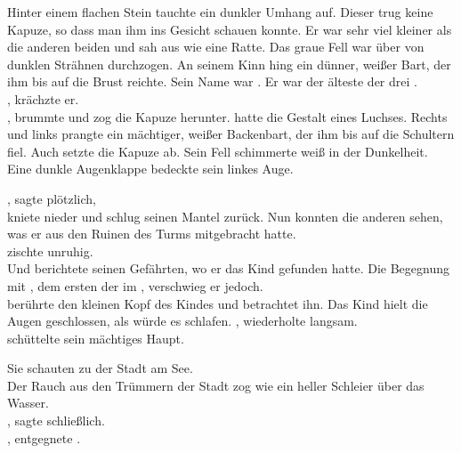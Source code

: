 \begin{Large}
Hinter einem flachen Stein tauchte ein dunkler Umhang auf. Dieser {\Schattenlaufer} trug keine Kapuze, so dass man ihm ins Gesicht schauen konnte. Er war sehr viel kleiner als die anderen beiden und sah aus wie eine Ratte. Das graue Fell war über von dunklen Strähnen durchzogen. An seinem Kinn hing ein dünner, weißer Bart, der ihm bis auf die Brust reichte. Sein Name war {\Dolo}. Er war der älteste der drei {\Schattenlaufer}.\\
, krächzte er.\\
, brummte {\Bomar} und zog die Kapuze herunter. 
{\Bomar} hatte die Gestalt eines Luchses. Rechts und links prangte ein mächtiger, weißer Backenbart, der ihm bis auf die Schultern fiel. Auch {\Eno} setzte die Kapuze ab. Sein Fell schimmerte weiß in der Dunkelheit. Eine dunkle Augenklappe bedeckte sein linkes Auge.

\q{{\Eno}}, sagte {\Dolo} plötzlich, \\
{\Eno} kniete nieder und schlug seinen Mantel zurück. Nun konnten die anderen sehen, was er aus den Ruinen des Turms mitgebracht hatte.\\
 zischte {\Bomar} unruhig. \\
Und {\Eno} berichtete seinen Gefährten, wo er das Kind gefunden hatte. Die Begegnung mit {\Pato}, dem ersten der {\Bangiri} im {\Enland}, verschwieg er jedoch.\\
{\Dolo} berührte den kleinen Kopf des Kindes und betrachtet ihn. Das Kind hielt die Augen geschlossen, als würde es schlafen. , wiederholte {\Dolo} langsam. \\
{\Bomar} schüttelte sein mächtiges Haupt. 

Sie schauten zu der Stadt am See.\\
Der Rauch aus den Trümmern der Stadt {\Tern} zog wie ein heller Schleier über das Wasser.\\
, sagte {\Eno} schließlich.  
\\
, entgegnete {\Bomar}.\\


\end{Large}
